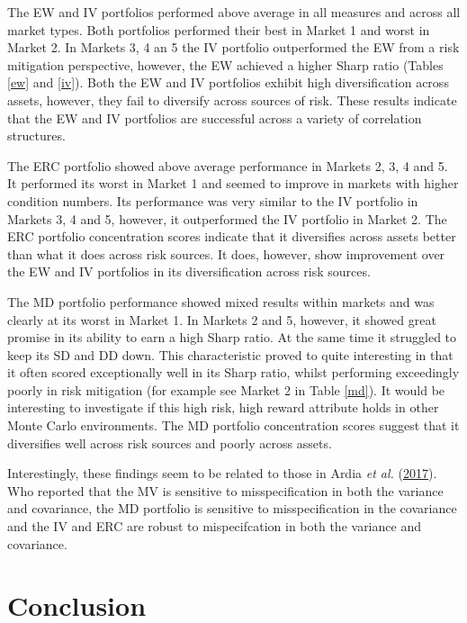 \documentclass[11pt,preprint, authoryear]{elsarticle}
\numberwithin{equation}{section}
\numberwithin{figure}{section}
\numberwithin{table}{section}
\begin{document}
The EW and IV portfolios performed above average in all measures and
across all market types. Both portfolios performed their best in Market
1 and worst in Market 2. In Markets 3, 4 an 5 the IV portfolio
outperformed the EW from a risk mitigation perspective, however, the EW
achieved a higher Sharp ratio (Tables \ref{ew} and \ref{iv}). Both the
EW and IV portfolios exhibit high diversification across assets,
however, they fail to diversify across sources of risk. These results
indicate that the EW and IV portfolios are successful across a variety
of correlation structures.

The ERC portfolio showed above average performance in Markets 2, 3, 4
and 5. It performed its worst in Market 1 and seemed to improve in
markets with higher condition numbers. Its performance was very similar
to the IV portfolio in Markets 3, 4 and 5, however, it outperformed the
IV portfolio in Market 2. The ERC portfolio concentration scores
indicate that it diversifies across assets better than what it does
across risk sources. It does, however, show improvement over the EW and
IV portfolios in its diversification across risk sources.

The MD portfolio performance showed mixed results within markets and was
clearly at its worst in Market 1. In Markets 2 and 5, however, it showed
great promise in its ability to earn a high Sharp ratio. At the same
time it struggled to keep its SD and DD down. This characteristic proved
to quite interesting in that it often scored exceptionally well in its
Sharp ratio, whilst performing exceedingly poorly in risk mitigation
(for example see Market 2 in Table \ref{md}). It would be interesting to
investigate if this high risk, high reward attribute holds in other
Monte Carlo environments. The MD portfolio concentration scores suggest
that it diversifies well across risk sources and poorly across assets.

Interestingly, these findings seem to be related to those in Ardia
\emph{et al.} (\protect\hyperlink{ref-ardia2017}{2017}). Who reported
that the MV is sensitive to misspecification in both the variance and
covariance, the MD portfolio is sensitive to misspecification in the
covariance and the IV and ERC are robust to mispecifcation in both the
variance and covariance.

\newpage

\hypertarget{conclusion}{%
\section{\texorpdfstring{Conclusion
\label{conclusion}}{Conclusion }}\label{conclusion}}
\end{document}
